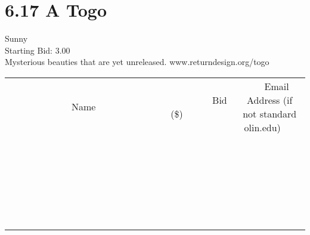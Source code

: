 \documentclass[11pt]{article}
\begin{document}
					\section*{6.17 A Togo}
					Sunny \\
					Starting Bid: 3.00 \\
					Mysterious beauties that are yet unreleased. www.returndesign.org/togo \\
					[6ex]
					\begin{tabular}{c c c}
						~~~~~~~~~~~~~Name~~~~~~~~~~~~~ & ~~~~~~~~~Bid (\$)~~~~~~~~~ & ~~~Email Address (if not standard olin.edu)~~~ \\
				
 & & \\
\hline
 & & \\
\hline
 & & \\
\hline
 & & \\
\hline
 & & \\
\hline
 & & \\
\hline
 & & \\
\hline
 & & \\
\hline
 & & \\
\hline
 & & \\
\hline
 & & \\
\hline
 & & \\
\hline
 & & \\
\hline
 & & \\
\hline
 & & \\
\hline
 & & \\
\hline
 & & \\
\hline
 & & \\
\hline
 & & \\
\hline
 & & \\
\hline
 & & \\
\hline
 & & \\
\hline
 & & \\
\hline
 & & \\
\hline
 & & \\
\hline
 & & \\
\hline
					\end{tabular}
					\clearpage
				
\end{document}
